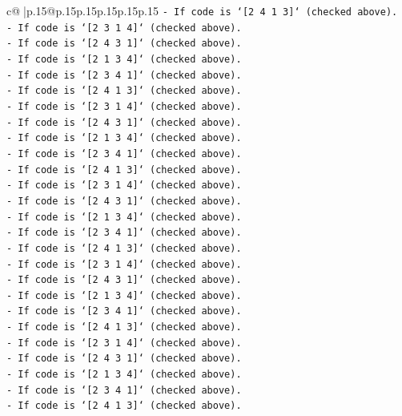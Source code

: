 \documentclass{article}
\begin{document}
{\begin{supertabular}{c@{$\;$}|p{.15\linewidth}@{}p{.15\linewidth}p{.15\linewidth}p{.15\linewidth}p{.15\linewidth}p{.15\linewidth}}
{{{\texttt{{-} If code is `{[}2 4 1 3{]}` (checked above).} \\
\texttt{{-} If code is `{[}2 3 1 4{]}` (checked above).} \\
\texttt{{-} If code is `{[}2 4 3 1{]}` (checked above).} \\
\texttt{{-} If code is `{[}2 1 3 4{]}` (checked above).} \\
\texttt{{-} If code is `{[}2 3 4 1{]}` (checked above).} \\
\texttt{{-} If code is `{[}2 4 1 3{]}` (checked above).} \\
\texttt{{-} If code is `{[}2 3 1 4{]}` (checked above).} \\
\texttt{{-} If code is `{[}2 4 3 1{]}` (checked above).} \\
\texttt{{-} If code is `{[}2 1 3 4{]}` (checked above).} \\
\texttt{{-} If code is `{[}2 3 4 1{]}` (checked above).} \\
\texttt{{-} If code is `{[}2 4 1 3{]}` (checked above).} \\
\texttt{{-} If code is `{[}2 3 1 4{]}` (checked above).} \\
\texttt{{-} If code is `{[}2 4 3 1{]}` (checked above).} \\
\texttt{{-} If code is `{[}2 1 3 4{]}` (checked above).} \\
\texttt{{-} If code is `{[}2 3 4 1{]}` (checked above).} \\
\texttt{{-} If code is `{[}2 4 1 3{]}` (checked above).} \\
\texttt{{-} If code is `{[}2 3 1 4{]}` (checked above).} \\
\texttt{{-} If code is `{[}2 4 3 1{]}` (checked above).} \\
\texttt{{-} If code is `{[}2 1 3 4{]}` (checked above).} \\
\texttt{{-} If code is `{[}2 3 4 1{]}` (checked above).} \\
\texttt{{-} If code is `{[}2 4 1 3{]}` (checked above).} \\
\texttt{{-} If code is `{[}2 3 1 4{]}` (checked above).} \\
\texttt{{-} If code is `{[}2 4 3 1{]}` (checked above).} \\
\texttt{{-} If code is `{[}2 1 3 4{]}` (checked above).} \\
\texttt{{-} If code is `{[}2 3 4 1{]}` (checked above).} \\
\texttt{{-} If code is `{[}2 4 1 3{]}` (checked above).} \\
}}}
\end{supertabular}}
\end{document}
